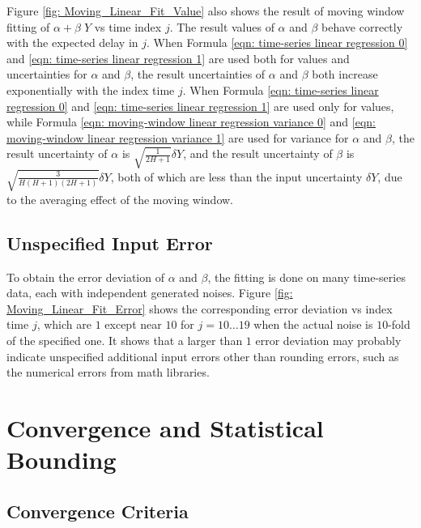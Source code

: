 \documentclass[twoside]{article}
\numberwithin{equation}{section}
\begin{document}
Figure \ref{fig: Moving_Linear_Fit_Value} also shows the result of moving window fitting of $\alpha + \beta\; Y$ vs time index $j$.
The result values of $\alpha$ and $\beta$ behave correctly with the expected delay in $j$.
When Formula \eqref{eqn: time-series linear regression 0} and \eqref{eqn: time-series linear regression 1} are used both for values and uncertainties for $\alpha$ and $\beta$, the result uncertainties of $\alpha$ and $\beta$ both increase exponentially with the index time $j$.
When Formula \eqref{eqn: time-series linear regression 0} and \eqref{eqn: time-series linear regression 1} are used only for values, while Formula \eqref{eqn: moving-window linear regression variance 0} and \eqref{eqn: moving-window linear regression variance 1} are used for variance for $\alpha$ and $\beta$, the result uncertainty of $\alpha$ is $\sqrt{\frac{1}{2H+1}} \delta Y$, and the  result uncertainty of $\beta$ is $\sqrt{\frac{3}{H (H+1)(2H+1)}} \delta Y$, both of which are less than the input uncertainty $\delta Y$, due to the averaging effect of the moving window.


\subsection{Unspecified Input Error}

To obtain the error deviation of $\alpha$ and $\beta$, the fitting is done on many time-series data, each with independent generated noises.
Figure \ref{fig: Moving_Linear_Fit_Error} shows the corresponding error deviation vs index time $j$, which are $1$ except near $10$ for $j = 10 \dots 19$ when the actual noise is $10$-fold of the specified one.
It shows that a larger than $1$ error deviation may probably indicate unspecified additional input errors other than rounding errors, such as the numerical errors from math libraries.







\clearpage
\section{Convergence and Statistical Bounding}
\label{sec:Convergence}

\subsection{Convergence Criteria}
\end{document}
